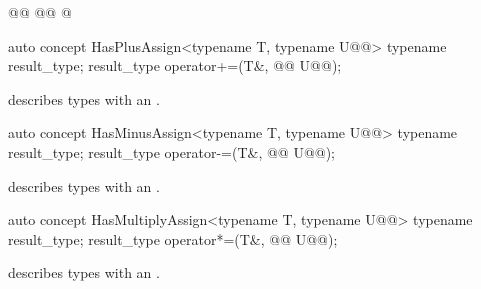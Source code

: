 \documentclass[american,twoside]{book}
\begin{document}
\begin{itemdescr}
\pnum
{}
\end{itemdescr}

\begin{itemdecl}
@@
  @@
@\removedCCC{\}}
\end{itemdecl}

\begin{itemdescr}
\pnum
{}
\end{itemdescr}

\begin{itemdecl}
auto concept HasPlusAssign<typename T, typename U@@> {
  typename result_type;
  result_type operator+=(T&, @@ U@\removedCCC{\&}@);
}
\end{itemdecl}

\begin{itemdescr}
\pnum
\mbox{\reallynote} describes types with an \mbox{}.
\end{itemdescr}

\begin{itemdecl}
auto concept HasMinusAssign<typename T, typename U@@> {
  typename result_type;
  result_type operator-=(T&, @@ U@\removedCCC{\&}@);
}
\end{itemdecl}

\begin{itemdescr}
\pnum
\mbox{\reallynote} describes types with an \mbox{}.
\end{itemdescr}

\begin{itemdecl}
auto concept HasMultiplyAssign<typename T, typename U@@> {
  typename result_type;
  result_type operator*=(T&, @@ U@\removedCCC{\&}@);
}
\end{itemdecl}

\begin{itemdescr}
\pnum
\mbox{\reallynote} describes types with an \mbox{}.
\end{itemdescr}
\end{document}

